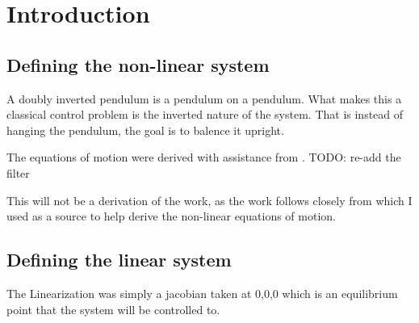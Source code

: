 \section{Introduction}

\subsection{Defining the non-linear system}
A doubly inverted pendulum is a pendulum on a pendulum. What makes this a classical control problem is the
inverted nature of the system. That is instead of hanging the pendulum, the goal is to balence it upright.

The equations of motion were derived with assistance from \cite{eq_of_motion}.
{\LARGE \color{red} TODO: re-add the filter}

This will not be a derivation of the work, as the work follows closely from \cite{eq_of_motion} which I used
as a source to help derive the non-linear equations of motion. 


\subsection{Defining the linear system}
The Linearization was simply a jacobian taken at 0,0,0 which is an equilibrium point that the system will be
controlled to.

